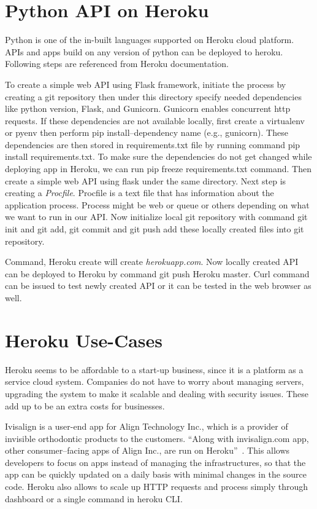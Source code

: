 \section{Python API on Heroku}

 Python is one of the in-built languages supported on Heroku cloud platform.
 APIs and apps build on any version of python can be deployed to heroku.
 Following steps are referenced from Heroku documentation. 

 To create a simple web API using Flask framework, initiate the process
 by creating a git repository then under this directory specify needed
 dependencies like python version, Flask, and Gunicorn. Gunicorn
 enables concurrent  http requests. If these
 dependencies are not available locally, first create a virtualenv or
 pyenv then perform pip install--dependency name (e.g., gunicorn). 
 These dependencies are
 then stored in requirements.txt file by running  command pip install 
 requirements.txt. To make sure the dependencies do
 not get changed while deploying app in Heroku, we can run pip freeze
 requirements.txt command. Then create a simple web API using flask under the same
 directory. Next step is creating a \textit{Procfile}. Procfile is a text file
 that has information
 about the application process. Process might be web or queue or others depending on 
 what we want to run in our API. Now initialize local git repository with command
 git init and git add, git commit and git push add these locally created files 
 into git repository.

 Command, Heroku create will create \textit{herokuapp.com}. Now locally created API
 can be deployed to Heroku by command git push Heroku master. Curl command
 can be issued to test newly created API or it can be tested in the web
 browser as well.


\section{Heroku Use-Cases}

 Heroku seems to be affordable to a start-up business, since it is a platform
 as a service cloud system. Companies do not have to worry about managing
 servers, upgrading the system to make it scalable and dealing with security
 issues. These add up to be an extra costs for businesses. 

 Ivisalign is a user-end app for Align Technology Inc., which is a provider of
 invisible orthodontic products to the customers. ``Along with invisalign.com app,
 other consumer--facing apps of Align Inc., are run on
 Heroku''~\cite{hid-sp18-415-www-customers-heroku-com}. This allows developers to focus
 on apps instead of managing the infrastructures, so that the app can be quickly
 updated on a daily basis with minimal changes in the source code. Heroku also
 allows to scale up HTTP requests and process simply through dashboard or a
 single command in heroku CLI. 

